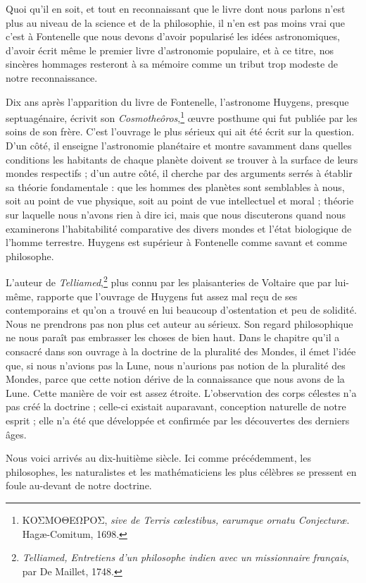 \documentclass[a4paper, 11pt, oneside]{article}
\begin{document}
Quoi qu'il en soit, et tout en reconnaissant que le livre dont nous parlons n'est plus au niveau de la science et de la philosophie, il n'en est pas moins vrai que c'est à Fontenelle que nous devons d'avoir popularisé les idées astronomiques, d'avoir écrit même le premier livre d'astronomie populaire, et à ce titre, nos sincères hommages resteront à sa mémoire comme un tribut trop modeste de notre reconnaissance.

Dix ans après l'apparition du livre de Fontenelle, l'astronome Huygens, presque septuagénaire, écrivit son \emph{Cosmotheôros},\footnote{ΚΟΣΜΟΘΕΩΡΟΣ, \emph{sive de Terris cœlestibus, earumque ornatu Conjecturæ}. Hagæ-Comitum, 1698.} œuvre posthume qui fut publiée par les soins de son frère. C'est l'ouvrage le plus sérieux qui ait été écrit sur la question. D'un côté, il enseigne l'astronomie planétaire et montre savamment dans quelles conditions les habitants de chaque planète doivent se trouver à la surface de leurs mondes respectifs ; d'un autre côté, il cherche par des arguments serrés à établir sa théorie fondamentale : que les hommes des planètes sont semblables à nous, soit au point de vue physique, soit au point de vue intellectuel et moral ; théorie sur laquelle nous n'avons rien à dire ici, mais que nous discuterons quand nous examinerons l'habitabilité comparative des divers mondes et l'état biologique de l'homme terrestre. Huygens est supérieur à Fontenelle comme savant et comme philosophe.

L'auteur de \emph{Telliamed},\footnote{\emph{Telliamed, Entretiens d'un philosophe indien avec un missionnaire français}, par De Maillet, 1748.} plus connu par les plaisanteries de Voltaire que par lui-même, rapporte que l'ouvrage de Huygens fut assez mal reçu de ses contemporains et qu'on a trouvé en lui beaucoup d'ostentation et peu de solidité. Nous ne prendrons pas non plus cet auteur au sérieux. Son regard philosophique ne nous paraît pas embrasser les choses de bien haut. Dans le chapitre qu'il a consacré dans son ouvrage à la doctrine de la pluralité des Mondes, il émet l'idée que, si nous n'avions pas la Lune, nous n'aurions pas notion de la pluralité des Mondes, parce que cette notion dérive de la connaissance que nous avons de la Lune. Cette manière de voir est assez étroite. L'observation des corps célestes n'a pas créé la doctrine ; celle-ci existait auparavant, conception naturelle de notre esprit ; elle n'a été que développée et confirmée par les découvertes des derniers âges.

Nous voici arrivés au dix-huitième siècle. Ici comme précédemment, les philosophes, les naturalistes et les mathématiciens les plus célèbres se pressent en foule au-devant de notre doctrine.
\end{document}
